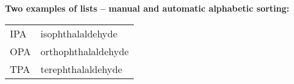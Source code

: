 
\textbf{Two examples of lists -- manual and automatic alphabetic sorting:}


\begin{longtable}{ p{}  p{} }

IPA & isophthalaldehyde\\

OPA & orthophthalaldehyde\\

TPA & terephthalaldehyde\\

\end{longtable}


\begin{sortedlist}
\end{sortedlist}